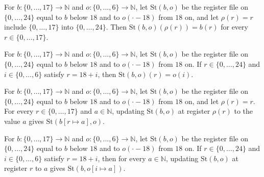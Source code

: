 \begin{theorem}
\label{Complexity.LogProg.SavitchARM.dpSt_ρ}
\leanok
{}
For $b:\{0,\dots,17\}\to\mathbb{N}$ and $o:\{0,\dots,6\}\to\mathbb{N}$, let $\mathrm{St}(b,o)$ be
the register file on $\{0,\dots,24\}$ equal to $b$ below $18$ and to $o(\cdot-18)$ from $18$ on,
and let $\rho(r)=r$ include $\{0,\dots,17\}$ into $\{0,\dots,24\}$. Then
$\mathrm{St}(b,o)(\rho(r))=b(r)$ for every $r\in\{0,\dots,17\}$.
\end{theorem}

\begin{theorem}
\label{Complexity.LogProg.SavitchARM.dpSt_own}
\leanok
{}
For $b:\{0,\dots,17\}\to\mathbb{N}$ and $o:\{0,\dots,6\}\to\mathbb{N}$, let $\mathrm{St}(b,o)$ be
the register file on $\{0,\dots,24\}$ equal to $b$ below $18$ and to $o(\cdot-18)$ from $18$ on.
If $r\in\{0,\dots,24\}$ and $i\in\{0,\dots,6\}$ satisfy $r=18+i$, then $\mathrm{St}(b,o)(r)=o(i)$.
\end{theorem}

\begin{theorem}
\label{Complexity.LogProg.SavitchARM.dpSt_upd_ρ}
\leanok
{}
For $b:\{0,\dots,17\}\to\mathbb{N}$ and $o:\{0,\dots,6\}\to\mathbb{N}$, let $\mathrm{St}(b,o)$ be
the register file on $\{0,\dots,24\}$ equal to $b$ below $18$ and to $o(\cdot-18)$ from $18$ on,
and let $\rho(r)=r$. For every $r\in\{0,\dots,17\}$ and $a\in\mathbb{N}$, updating
$\mathrm{St}(b,o)$ at register $\rho(r)$ to the value $a$ gives $\mathrm{St}(b[r\mapsto a],o)$.
\end{theorem}

\begin{theorem}
\label{Complexity.LogProg.SavitchARM.dpSt_upd_own}
\leanok
{}
For $b:\{0,\dots,17\}\to\mathbb{N}$ and $o:\{0,\dots,6\}\to\mathbb{N}$, let $\mathrm{St}(b,o)$ be
the register file on $\{0,\dots,24\}$ equal to $b$ below $18$ and to $o(\cdot-18)$ from $18$ on. If
$r\in\{0,\dots,24\}$ and $i\in\{0,\dots,6\}$ satisfy $r=18+i$, then for every $a\in\mathbb{N}$,
updating $\mathrm{St}(b,o)$ at register $r$ to $a$ gives $\mathrm{St}(b,o[i\mapsto a])$.
\end{theorem}

